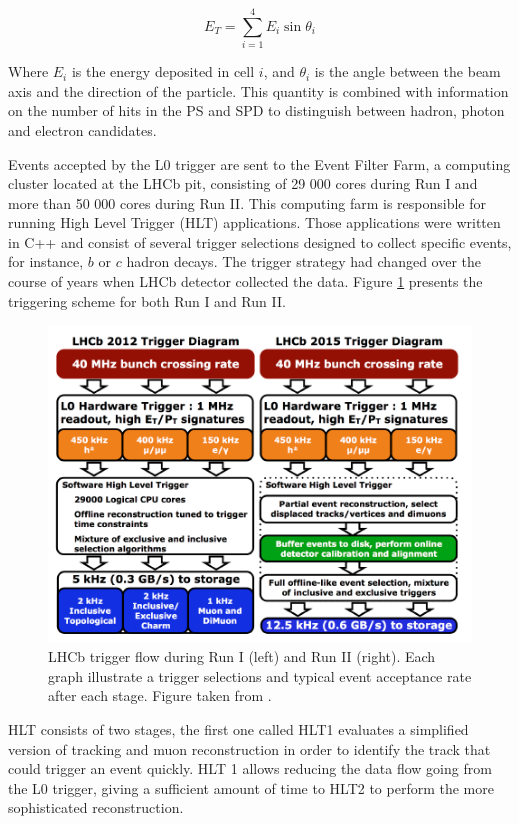 \begin{equation}
    E_T = \sum_{i=1}^{4} E_i \sin\theta_i
\end{equation}

Where $E_i$ is the energy deposited in cell $i$, and $\theta_i$ is the angle between the beam axis and the direction of the particle. 
This quantity is combined with information on the number of hits in the PS and SPD to distinguish between hadron, photon and electron candidates. 


Events accepted by the L0 trigger are sent to the Event Filter Farm, a computing cluster located at the LHCb pit, consisting of 29 000 cores during Run I and more than 50 000 cores during Run II.  This computing farm is responsible for running High Level Trigger (HLT) applications. Those applications were written in C++ and consist of several trigger selections designed to collect specific events, for instance, $b$ or $c$ hadron decays. The trigger strategy had changed over the course of years when LHCb detector collected the data. Figure \ref{fig:trigger} presents the triggering scheme for both Run I and Run II. 


\begin{figure}
\centering
\includegraphics[width=\linewidth]{figures/trigger.PNG}
\caption{LHCb trigger flow during Run I (left) and Run II (right). Each graph illustrate a trigger selections and typical event acceptance rate after each stage. Figure taken from \cite{trigger_schame}.
\label{fig:trigger}}
\end{figure}

HLT consists of two stages, the first one called HLT1 evaluates a simplified version of tracking and muon reconstruction in order to identify the track that could trigger an event quickly. HLT 1 allows reducing the data flow going from the L0 trigger, giving a sufficient amount of time to HLT2 to perform the more sophisticated reconstruction.

